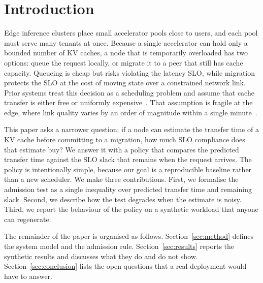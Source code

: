 \section{Introduction}
\label{sec:intro}

Edge inference clusters place small accelerator pools close to users, and each pool must serve many tenants at once.
Because a single accelerator can hold only a bounded number of KV caches, a node that is temporarily overloaded has two options: queue the request locally, or migrate it to a peer that still has cache capacity.
Queueing is cheap but risks violating the latency SLO, while migration protects the SLO at the cost of moving state over a constrained network link.
Prior systems treat this decision as a scheduling problem and assume that cache transfer is either free or uniformly expensive~\cite{smith2024}.
That assumption is fragile at the edge, where link quality varies by an order of magnitude within a single minute~\cite{lee2025}.

This paper asks a narrower question: if a node can estimate the transfer time of a KV cache before committing to a migration, how much SLO compliance does that estimate buy?
We answer it with a policy that compares the predicted transfer time against the SLO slack that remains when the request arrives.
The policy is intentionally simple, because our goal is a reproducible baseline rather than a new scheduler.
We make three contributions.
First, we formalise the admission test as a single inequality over predicted transfer time and remaining slack.
Second, we describe how the test degrades when the estimate is noisy.
Third, we report the behaviour of the policy on a synthetic workload that anyone can regenerate.

The remainder of the paper is organised as follows.
Section~\ref{sec:method} defines the system model and the admission rule.
Section~\ref{sec:results} reports the synthetic results and discusses what they do and do not show.
Section~\ref{sec:conclusion} lists the open questions that a real deployment would have to answer.
